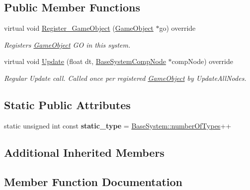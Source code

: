 \subsection*{Public Member Functions}
\begin{DoxyCompactItemize}
\item 
virtual void \hyperlink{classFollowCurvesPathSystem_a5d9cd70cc1adb8170dc7eeec28c25036}{Register\+\_\+\+Game\+Object} (\hyperlink{classGameObject}{Game\+Object} $\ast$go) override
\begin{DoxyCompactList}\small\item\em Registers \hyperlink{classGameObject}{Game\+Object} GO in this system. \end{DoxyCompactList}\item 
virtual void \hyperlink{classFollowCurvesPathSystem_a23f3ab7e281025eb8e40ef150a05a3b4}{Update} (float dt, \hyperlink{structBaseSystemCompNode}{Base\+System\+Comp\+Node} $\ast$comp\+Node) override
\begin{DoxyCompactList}\small\item\em Regular Update call. Called once per registered \hyperlink{classGameObject}{Game\+Object} by Update\+All\+Nodes. \end{DoxyCompactList}\end{DoxyCompactItemize}
\subsection*{Static Public Attributes}
\begin{DoxyCompactItemize}
\item 
\mbox{\label{classFollowCurvesPathSystem_ab0b30c1fbef8d9f271c340dd7b160fcb}} 
static unsigned int const {\bfseries static\+\_\+type} = \hyperlink{classBaseSystem_a7ef356edab3cfb02905e0a73a645b131}{Base\+System\+::number\+Of\+Types}++
\end{DoxyCompactItemize}
\subsection*{Additional Inherited Members}


\subsection{Member Function Documentation}
\mbox{\label{classFollowCurvesPathSystem_a5d9cd70cc1adb8170dc7eeec28c25036}} 
